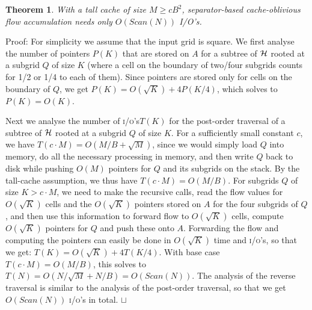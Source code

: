 \documentclass[10pt,a4paper]{article}
\newtheorem{theorem}{Theorem}
\newenvironment{proof}{Proof:}{\qed}
\def\squareforqed{\hbox{\rlap{$\sqcap$}$\sqcup$}}
\def\qed{\ifmmode\squareforqed\else{\unskip\nobreak\hfil
\penalty50\hskip1em\null\nobreak\hfil\squareforqed
\parfillskip=0pt\finalhyphendemerits=0\endgraf}\fi}
\def\ios{\textsc{i/o}'s\xspace}
\def\scan{\mathit{Scan}}
\begin{document}
\begin{theorem}\label{CacheAwareAccumulation}
With a tall cache of size $M \geq c B^2$, separator-based cache-oblivious flow accumulation needs only $O(\scan(N))$ I/O's.
\end{theorem}
\begin{proof}
For simplicity we assume that the input grid is square.
We first analyse the number of pointers $P(K)$ that are stored on $A$ for a subtree of ${\cal H}$ rooted at a subgrid $Q$ of size $K$ (where a cell on the boundary of two/four subgrids counts for 1/2 or 1/4 to each of them). Since pointers are stored only for cells on the boundary of $Q$, we get $P(K) = O(\sqrt K) + 4 P(K/4)$, which solves to $P(K) = O(K)$.

Next we analyse the number of \ios $T(K)$ for the post-order traversal of a subtree of ${\cal H}$ rooted at a subgrid $Q$ of size $K$. For a sufficiently small constant $c$, we have $T(c \cdot M) = O(M/B + \sqrt M)$, since we would simply load $Q$ into memory, do all the necessary processing in memory, and then write $Q$ back to disk while  pushing $O(M)$ pointers for $Q$ and its subgrids on the stack. By the tall-cache assumption, we thus have $T(c \cdot M) = O(M/B)$. For subgrids $Q$ of size $K > c \cdot M$, we need to make the recursive calls, read the flow values for $O(\sqrt K)$ cells and the $O(\sqrt K)$ pointers stored on $A$ for the four subgrids of $Q$, and then use this information to forward flow to $O(\sqrt K)$ cells, compute $O(\sqrt K)$ pointers for $Q$ and push these onto $A$. Forwarding the flow and computing the pointers can easily be done in $O(\sqrt K)$ time and \ios, so that we get: $T(K) = O(\sqrt K) + 4 T(K/4)$.
With base case $T(c \cdot M) = O(M/B)$, this solves to $T(N) = O(N/\sqrt M + N/B) = O(\scan(N))$.
The analysis of the reverse traversal is similar to the analysis of the post-order traversal, so that we get $O(\scan(N))$ \ios in total.
\end{proof}
\end{document}
